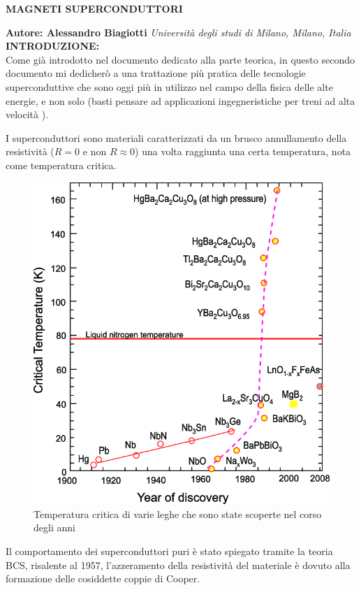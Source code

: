 \documentclass[a4paper,10pt]{article}
\begin{document}
\noindent
\begin{center}
	\textbf{{\Large MAGNETI SUPERCONDUTTORI}} \\
\end{center}

\noindent
\textbf{Autore: Alessandro Biagiotti} \textit{Università degli studi di Milano, Milano, Italia}
\\

\noindent
\textbf{INTRODUZIONE:}
\\
Come già introdotto nel documento dedicato alla parte teorica, in questo secondo documento mi
dedicherò a una trattazione più pratica delle tecnologie superconduttive che sono oggi più in
utilizzo nel campo della fisica delle alte energie, e non solo (basti pensare ad applicazioni
ingegneristiche per treni ad alta velocità \cite{maglev}).

I superconduttori sono materiali caratterizzati da un brusco annullamento della resistività ($R = 0$
e non $R \approx 0$) una volta raggiunta una certa temperatura, nota come temperatura critica.
\begin{figure}[h!]
	\centering
	\includegraphics[scale=0.35]{fig/The-evolution-of-critical-temperatures-since-the-discovery-of-superconductivity.png}
	\caption{Temperatura critica di varie leghe che sono state scoperte nel corso degli
	anni \cite{critical-temp}}
\end{figure}
Il comportamento dei superconduttori puri è stato spiegato tramite la teoria BCS, risalente al 1957,
l'azzeramento della resistività del materiale è dovuto alla formazione delle cosiddette coppie di
Cooper.
\end{document}
